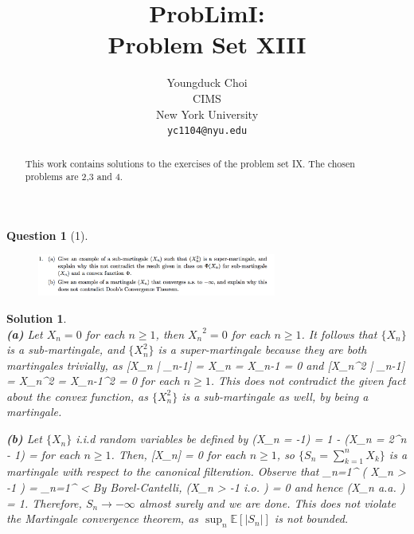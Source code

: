 \documentclass{article} %
\title{ProbLimI: \\
Problem Set XIII}
\author{
Youngduck Choi \\
CIMS \\
New York University\\
\texttt{yc1104@nyu.edu} \\
}
\def\eQb#1\eQe{\begin{eqnarray*}#1\end{eqnarray*}}
\theoremstyle{quest}
\newtheorem*{question}{Question}
\newtheorem*{solution}{Solution}
\begin{document}
\maketitle

\begin{abstract}
This work contains solutions to the exercises of the problem set IX. The
chosen problems are 2,3 and 4.
\end{abstract}

\bigskip

\begin{question}[1]
\hfill
\begin{figure}[h!]
  \centering
    \includegraphics[width=0.7\textwidth]{problim-e13-p1.png}
\end{figure}
\end{question}
\begin{solution} \hfill \\
\textbf{(a)} Let
$X_n = 0$ for each $n \geq 1$, then ${X_n}^2 = 0$ for each $n \geq 1$.
It follows that $\{X_n\}$ is a sub-martingale, and $\{X_n^{2}\}$ is a super-martingale
because they are both martingales trivially, as 
\eQb
\mathbb{E}[X_n | _{n-1}] = X_n = X_{n-1} = 0
\eQe
and
\eQb
\mathbb{E}[X_n^2 | _{n-1}] = X_n^2 = X_{n-1}^2 = 0
\eQe
for each $n \geq 1$. This does not contradict the given fact about the convex function,
as $\{X_n^2\}$ is a sub-martingale as well, by being a martingale.

\bigskip

\textbf{(b)} Let $\{ X_n \}$ i.i.d random variables be defined by
\eQb
\mathbb{P}(X_n = -1) = 1  -  \>\>\>  \>\>\>
(X_n = 2^{n} - 1) =  
\eQe 
for each $n \geq 1$. Then,
\eQb
\mathbb{E}[X_n] = 0 
\eQe
for each $n \geq 1$, so $\{S_n = \sum_{k=1}^{n} X_k\}$ 
is a martingale with respect to the
canonical filteration. Observe that
\eQb
\sum_{n=1}^{\infty} ( X_n > -1  ) = 
\sum_{n=1}^{\infty}  < \infty
\eQe
By Borel-Cantelli,
\eQb
\mathbb{P}(X_n > -1 \>\> i.o. ) = 0 
\eQe
and hence
\eQb
\mathbb{P}(X_n   \>\> a.a. ) = 1. 
\eQe
Therefore, $S_n \to -\infty$ almost surely and we are done. This 
does not violate the Martingale convergence theorem, as 
$\sup_n \mathbb{E}[|S_n|]$ is not bounded. 

\bigskip

\end{solution}
\end{document}
